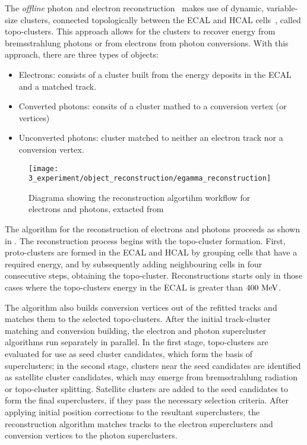 The \textit{offline} photon and electron reconstruction~\cite{ATLAS-EGamma-Performance-2015-2017,ATLAS-TopoClusters-Run2} makes use of dynamic, variable-size clusters, connected topologically between the \ac{ECAL} and \ac{HCAL} cells~\cite{ATLAS-TopoClusters-Run1}, called topo-clusters. This approach allows for the clusters to recover energy from bremsstrahlung photons or from electrons from photon conversions. With this approach, there are three types of objects:
\begin{itemize}
    \item Electrons: consists of a cluster built from the energy deposits in the \ac{ECAL} and a matched track.
    \item Converted photons: consits of a cluster mathed to a conversion vertex (or vertices)
    \item Unconverted photons: cluster matched to neither an electron track nor a conversion vertex.
\end{itemize}

\begin{figure}[ht!]
    \centering
    \texttt{[image: 3\_experiment/object\_reconstruction/egamma\_reconstruction]}
    \caption{Diagrama showing the reconstruction algortihm workflow for electrons and photons, extacted from }
    \label{fig:objects:egamma:reco:reco_diagram}
\end{figure}

The algorithm for the reconstruction of electrons and photons proceeds as shown in \Fig{\ref{fig:objects:egamma:reco:reco_diagram}}.
The reconstruction process begins with the topo-cluster formation. First, proto-clusters are formed in the \ac{ECAL} and \ac{HCAL} by grouping cells that have a required energy, and by subsequently adding neighbouring cells in four consecutive steps, obtaining the topo-cluster. Reconstructions starts only in those cases where the topo-clusters energy in the \ac{ECAL} is greater than \(400~\text{MeV}\).

The algorithm also builds conversion vertices out of the refitted tracks and matches them to the selected topo-clusters.
After the initial track-cluster matching and conversion building, the electron and photon supercluster algorithms run separately in parallel. In the first stage, topo-clusters are evaluated for use as seed cluster candidates, which form the basis of superclusters; in the second stage, clusters near the seed candidates are identified as satellite cluster candidates, which may emerge from bremsstrahlung radiation or topo-cluster splitting. Satellite clusters are added to the seed candidates to form the final superclusters, if they pass the necessary selection criteria.
After applying initial position corrections to the resultant superclusters, the reconstruction algorithm matches tracks to
the electron superclusters and conversion vertices to the photon superclusters.

